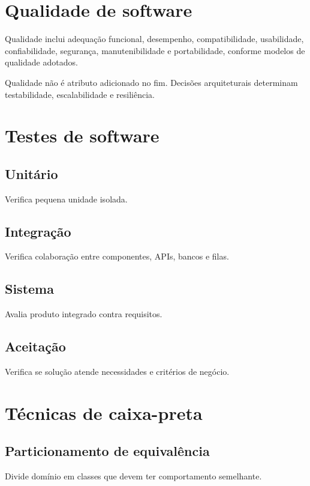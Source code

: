 \section{Qualidade de software}

Qualidade inclui adequação funcional, desempenho, compatibilidade, usabilidade, confiabilidade, segurança, manutenibilidade e portabilidade, conforme modelos de qualidade adotados.

Qualidade não é atributo adicionado no fim. Decisões arquiteturais determinam testabilidade, escalabilidade e resiliência.

\section{Testes de software}

\subsection{Unitário}

Verifica pequena unidade isolada.

\subsection{Integração}

Verifica colaboração entre componentes, APIs, bancos e filas.

\subsection{Sistema}

Avalia produto integrado contra requisitos.

\subsection{Aceitação}

Verifica se solução atende necessidades e critérios de negócio.

\section{Técnicas de caixa-preta}

\subsection{Particionamento de equivalência}

Divide domínio em classes que devem ter comportamento semelhante.

